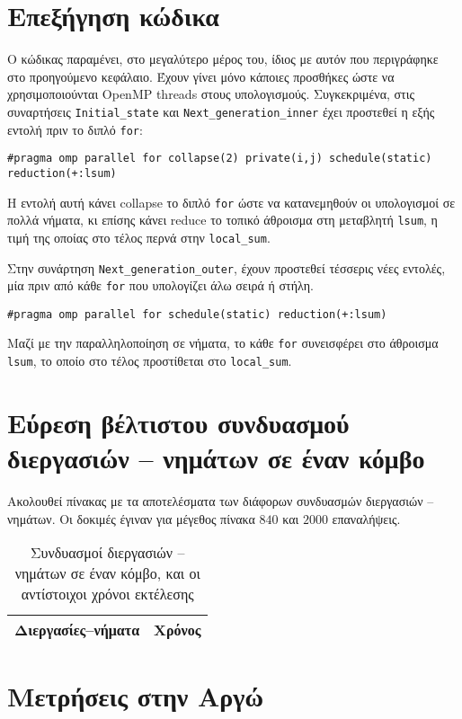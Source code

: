 \section{Επεξήγηση κώδικα}
\begin{multicols}{2}
Ο κώδικας παραμένει, στο μεγαλύτερο μέρος του, ίδιος με αυτόν που περιγράφηκε στο προηγούμενο κεφάλαιο. Έχουν γίνει μόνο κάποιες προσθήκες ώστε να χρησιμοποιούνται OpenMP threads στους υπολογισμούς. Συγκεκριμένα, στις συναρτήσεις \texttt{Initial_state} και \texttt{Next_generation_inner} έχει προστεθεί η εξής εντολή πριν το διπλό \texttt{for}: \\
\end{multicols}

\begin{tcolorbox}
\texttt{#pragma}\texttt{ omp parallel for collapse(2) private(i,j) schedule(static) reduction(+:lsum)}
\end{tcolorbox}
\begin{multicols}{2}
Η εντολή αυτή κάνει collapse  το διπλό \texttt{for} ώστε να κατανεμηθούν οι υπολογισμοί σε πολλά νήματα, κι επίσης κάνει reduce το τοπικό άθροισμα στη μεταβλητή \texttt{lsum}, η τιμή της οποίας στο τέλος περνά στην \texttt{local_sum}. \par

Στην συνάρτηση \texttt{Next_generation_outer}, έχουν προστεθεί τέσσερις νέες εντολές, μία πριν από κάθε \texttt{for} που υπολογίζει άλω σειρά ή στήλη. \\
\end{multicols}

\begin{tcolorbox}
\texttt{#pragma}\texttt{ omp parallel for schedule(static) reduction(+:lsum)}
\end{tcolorbox}
Μαζί με την παραλληλοποίηση σε νήματα, το κάθε \texttt{for} συνεισφέρει στο άθροισμα \texttt{lsum}, το οποίο στο τέλος προστίθεται στο \texttt{local_sum}.

\section{Εύρεση βέλτιστου συνδυασμού διεργασιών -- νημάτων σε έναν κόμβο}

Ακολουθεί πίνακας με τα αποτελέσματα των διάφορων συνδυασμών διεργασιών -- νημάτων. Οι δοκιμές έγιναν για μέγεθος πίνακα $840$ και $2000$ επαναλήψεις.

\begin{table}[h]
\centering
\begin{tabular}{| c | c | }
\hline
Διεργασίες--νήματα & Χρόνος \\
\hline
\end{tabular}
\caption{Συνδυασμοί διεργασιών -- νημάτων σε έναν κόμβο, και οι αντίστοιχοι χρόνοι εκτέλεσης}
\label{tab:OpenMPOneNode}
\end{table}
\section{Μετρήσεις στην Αργώ}